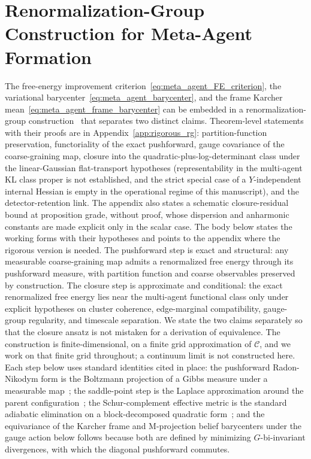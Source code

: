 \documentclass[11pt]{article}
\begin{document}
\section{Renormalization-Group Construction for Meta-Agent Formation}
\label{sec:meta_agent_rg}

The free-energy improvement criterion~\eqref{eq:meta_agent_FE_criterion}, the variational barycenter~\eqref{eq:meta_agent_barycenter}, and the frame Karcher mean~\eqref{eq:meta_agent_frame_barycenter} can be embedded in a renormalization-group construction~\cite{Wilson1971, Cardy1996} that separates two distinct claims. Theorem-level statements with their proofs are in Appendix~\ref{app:rigorous_rg}: partition-function preservation, functoriality of the exact pushforward, gauge covariance of the coarse-graining map, closure into the quadratic-plus-log-determinant class under the linear-Gaussian flat-transport hypotheses (representability in the multi-agent KL class proper is not established, and the strict special case of a $Y$-independent internal Hessian is empty in the operational regime of this manuscript), and the detector-retention link. The appendix also states a schematic closure-residual bound at proposition grade, without proof, whose dispersion and anharmonic constants are made explicit only in the scalar case. The body below states the working forms with their hypotheses and points to the appendix where the rigorous version is needed. The pushforward step is exact and structural: any measurable coarse-graining map admits a renormalized free energy through its pushforward measure, with partition function and coarse observables preserved by construction. The closure step is approximate and conditional: the exact renormalized free energy lies near the multi-agent functional class only under explicit hypotheses on cluster coherence, edge-marginal compatibility, gauge-group regularity, and timescale separation. We state the two claims separately so that the closure ansatz is not mistaken for a derivation of equivalence. The construction is finite-dimensional, on a finite grid approximation of $\mathcal{C}$, and we work on that finite grid throughout; a continuum limit is not constructed here. Each step below uses standard identities cited in place: the pushforward Radon-Nikodym form is the Boltzmann projection of a Gibbs measure under a measurable map~\cite{Cardy1996}; the saddle-point step is the Laplace approximation around the parent configuration~\cite{Cardy1996}; the Schur-complement effective metric is the standard adiabatic elimination on a block-decomposed quadratic form~\cite{HornJohnson2013}; and the equivariance of the Karcher frame and M-projection belief barycenters under the gauge action below follows because both are defined by minimizing $G$-bi-invariant divergences, with which the diagonal pushforward commutes.
\end{document}
